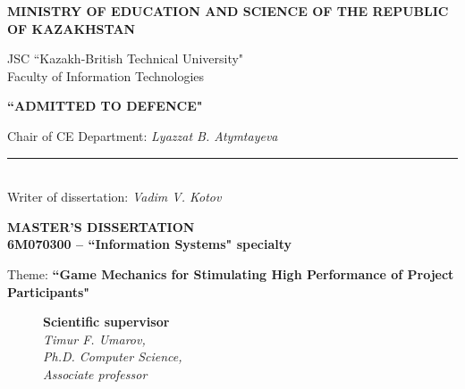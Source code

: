 \begin{titlepage}
    \pagestyle{empty}
    \begin{center}
        {\bf{\MakeUppercase{Ministry of education and science of the republic of Kazakhstan}}

        \vspace{14pt}

        JSC ``Kazakh-British Technical University"\\
        Faculty of Information Technologies}
       
       \vspace{14pt}
       
        \begin{flushright}
            {\bf \MakeUppercase{``Admitted to defence"}}

            Chair of CE Department: {\em Lyazzat B. Atymtayeva}\\
            \vspace{0.5\baselineskip}
            \rule{13em}{0.4pt}\\
            \vspace{14pt}
          Writer of dissertation: {\em Vadim V. Kotov}
          \vspace{14pt}
        \end{flushright}
        
        {\bf
        \MakeUppercase{Master's Dissertation}\\
        6M070300 -- ``Information Systems" specialty}

        \vspace{14pt}

        Theme: {\bf ``Game Mechanics for Stimulating High Performance of Project Participants"}
        
        \vspace{28pt}
        
        \begin{figure}[ht]
            \begin{minipage}[t]{0.6\linewidth}
                {\bf Scientific supervisor}\\

                {\em Timur F. Umarov,\\
                Ph.D. Computer Science,\\
                Associate professor}\\
            \end{minipage}
        \end{figure}


\end{center}
\end{titlepage}
